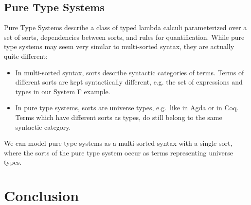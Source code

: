 \documentclass[a4paper, UKenglish, cleveref, autoref, thm-restate]{lipics-v2021}
\newcommand*\ACode[1]{\AgdaFontStyle{\textcolor{mygray}{#1}}}
\begin{document}
  \subsection{Pure Type Systems}
  Pure Type Systems\cite{DBLP:conf/esop/BarendregtH90, berarditowards, terlouw1989een}
  describe a class of typed lambda calculi parameterized over a set of
  sorts, dependencies between sorts, and rules for quantification.
  While pure type systems may seem very similar to multi-sorted
  syntax, they are actually quite different:
  \begin{itemize}
  \item 
    In multi-sorted syntax, sorts describe syntactic categories of terms. Terms
    of different sorts are kept syntactically different, e.g. the set of expressions
    \ACode{S ⊢ 𝕖} and types \ACode{S ⊢ 𝕥} in our System F example.
  \item 
    In pure type systems, sorts are universe types, e.g.\ like
    \ACode{Set} in Agda or \ACode{Prop} in Coq.
    Terms which have different sorts as types, do still belong to the
    same syntactic category.
  \end{itemize}

  We can model pure type systems as a multi-sorted syntax with a single sort,
  where the sorts of the pure type system occur as terms representing universe types.


  \section{Conclusion}
  \label{sec:conclusion}


\end{document}
